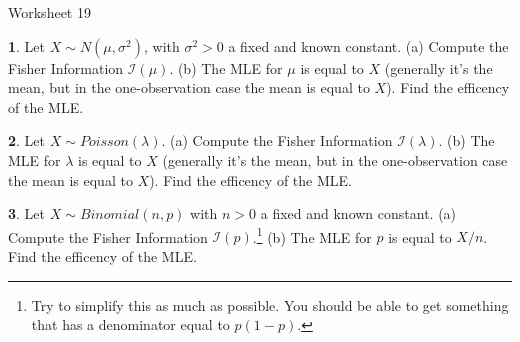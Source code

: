 \documentclass{tufte-handout}
\begin{document}
\justify

{\LARGE Worksheet 19}

\vspace*{18pt}


\textbf{1}. Let $X \sim N(\mu, \sigma^2)$, with $\sigma^2 > 0$ a fixed and known constant.
(a) Compute the Fisher Information $\mathcal{I}(\mu)$. (b) The MLE for $\mu$
is equal to $X$ (generally it's the mean, but in the one-observation case the
mean is equal to $X$). Find the efficency of the MLE.

\textbf{2}. Let $X \sim Poisson(\lambda)$. (a) Compute the Fisher Information $\mathcal{I}(\lambda)$.
(b) The MLE for $\lambda$ is equal to $X$ (generally it's the mean, but in the one-observation
case the mean is equal to $X$). Find the efficency of the MLE.

\textbf{3}. Let $X \sim Binomial(n, p)$ with $n>0$ a fixed and known constant.
(a) Compute the Fisher Information $\mathcal{I}(p)$.\footnote{
  Try to simplify this as much as possible. You should be able to
  get something that has a denominator equal to $p(1-p)$.
} (b) The MLE for $p$ is
equal to $X/n$. Find the efficency of the MLE.
\end{document}
